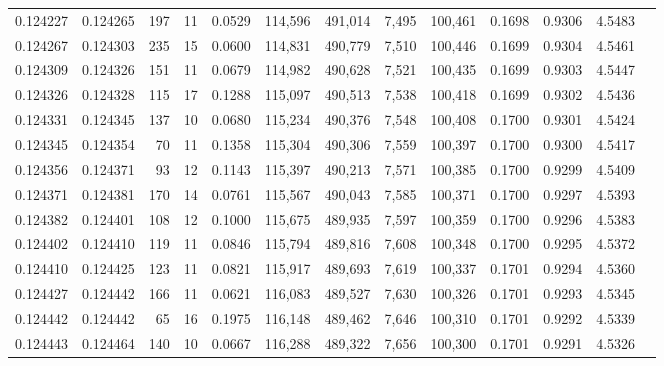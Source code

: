 \begin{tabular}{rrrrrrrrrrrrr}
0.124227 & 0.124265 &   197 &  11 &                                     0.0529 & 114,596 & 491,014 &   7,495 & 100,461 & 0.1698 & 0.9306 & 4.5483 \\
0.124267 & 0.124303 &   235 &  15 &                                     0.0600 & 114,831 & 490,779 &   7,510 & 100,446 & 0.1699 & 0.9304 & 4.5461 \\
0.124309 & 0.124326 &   151 &  11 &                                     0.0679 & 114,982 & 490,628 &   7,521 & 100,435 & 0.1699 & 0.9303 & 4.5447 \\
0.124326 & 0.124328 &   115 &  17 &                                     0.1288 & 115,097 & 490,513 &   7,538 & 100,418 & 0.1699 & 0.9302 & 4.5436 \\
0.124331 & 0.124345 &   137 &  10 &                                     0.0680 & 115,234 & 490,376 &   7,548 & 100,408 & 0.1700 & 0.9301 & 4.5424 \\
0.124345 & 0.124354 &    70 &  11 &                                     0.1358 & 115,304 & 490,306 &   7,559 & 100,397 & 0.1700 & 0.9300 & 4.5417 \\
0.124356 & 0.124371 &    93 &  12 &                                     0.1143 & 115,397 & 490,213 &   7,571 & 100,385 & 0.1700 & 0.9299 & 4.5409 \\
0.124371 & 0.124381 &   170 &  14 &                                     0.0761 & 115,567 & 490,043 &   7,585 & 100,371 & 0.1700 & 0.9297 & 4.5393 \\
0.124382 & 0.124401 &   108 &  12 &                                     0.1000 & 115,675 & 489,935 &   7,597 & 100,359 & 0.1700 & 0.9296 & 4.5383 \\
0.124402 & 0.124410 &   119 &  11 &                                     0.0846 & 115,794 & 489,816 &   7,608 & 100,348 & 0.1700 & 0.9295 & 4.5372 \\
0.124410 & 0.124425 &   123 &  11 &                                     0.0821 & 115,917 & 489,693 &   7,619 & 100,337 & 0.1701 & 0.9294 & 4.5360 \\
0.124427 & 0.124442 &   166 &  11 &                                     0.0621 & 116,083 & 489,527 &   7,630 & 100,326 & 0.1701 & 0.9293 & 4.5345 \\
0.124442 & 0.124442 &    65 &  16 &                                     0.1975 & 116,148 & 489,462 &   7,646 & 100,310 & 0.1701 & 0.9292 & 4.5339 \\
0.124443 & 0.124464 &   140 &  10 &                                     0.0667 & 116,288 & 489,322 &   7,656 & 100,300 & 0.1701 & 0.9291 & 4.5326 \\

\end{tabular}
